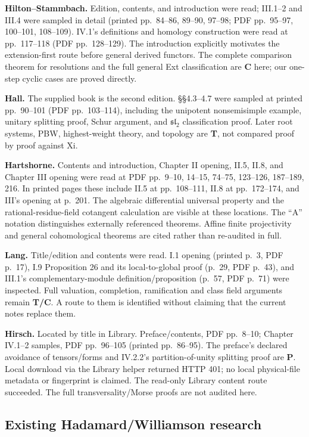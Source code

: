 \documentclass[
  11pt,
]{article}
\begin{document}
\textbf{Hilton--Stammbach.} Edition, contents, and introduction were
read; III.1--2 and III.4 were sampled in detail (printed pp.~84--86,
89--90, 97--98; PDF pp.~95--97, 100--101, 108--109). IV.1's definitions
and homology construction were read at pp.~117--118 (PDF pp.~128--129).
The introduction explicitly motivates the extension-first route before
general derived functors. The complete comparison theorem for
resolutions and the full general Ext classification are \textbf{C} here;
our one-step cyclic cases are proved directly.

\textbf{Hall.} The supplied book is the second edition. §§4.3--4.7 were
sampled at printed pp.~90--101 (PDF pp.~103--114), including the
unipotent nonsemisimple example, unitary splitting proof, Schur
argument, and \(\mathfrak{sl}_2\) classification proof. Later root
systems, PBW, highest-weight theory, and topology are \textbf{T}, not
compared proof by proof against Xi.

\textbf{Hartshorne.} Contents and introduction, Chapter II opening,
II.5, II.8, and Chapter III opening were read at PDF pp.~9--10, 14--15,
74--75, 123--126, 187--189, 216. In printed pages these include II.5 at
pp.~108--111, II.8 at pp.~172--174, and III's opening at p.~201. The
algebraic differential universal property and the rational-residue-field
cotangent calculation are visible at these locations. The ``A'' notation
distinguishes externally referenced theorems. Affine finite projectivity
and general cohomological theorems are cited rather than re-audited in
full.

\textbf{Lang.} Title/edition and contents were read. I.1 opening
(printed p.~3, PDF p.~17), I.9 Proposition 26 and its local-to-global
proof (p.~29, PDF p.~43), and III.1's complementary-module
definition/proposition (p.~57, PDF p.~71) were inspected. Full
valuation, completion, ramification and class field arguments remain
\textbf{T/C}. A route to them is identified without claiming that the
current notes replace them.

\textbf{Hirsch.} Located by title in Library. Preface/contents, PDF
pp.~8--10; Chapter IV.1--2 samples, PDF pp.~96--105 (printed
pp.~86--95). The preface's declared avoidance of tensors/forms and
IV.2.2's partition-of-unity splitting proof are \textbf{P}. Local
download via the Library helper returned HTTP 401; no local
physical-file metadata or fingerprint is claimed. The read-only Library
content route succeeded. The full transversality/Morse proofs are not
audited here.

\subsection{Existing Hadamard/Williamson
research}\label{existing-hadamardwilliamson-research}
\end{document}
